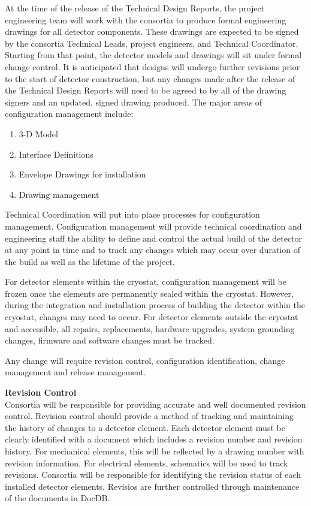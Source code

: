 At the time of the release of the Technical Design Reports, the
project engineering team will work with the consortia to produce
formal engineering drawings for all detector components.  These
drawings are expected to be signed by the consortia Technical Leads,
project engineers, and Technical Coordinator.  Starting from that
point, the detector models and drawings will sit under formal change
control.  It is anticipated that designs will undergo further
revisions prior to the start of detector construction, but any changes
made after the release of the Technical Design Reports will need to be
agreed to by all of the drawing signers and an updated, signed drawing
produced. The major areas of configuration management include:
\begin{enumerate}
  \item 3-D Model
  \item Interface Definitions
  \item Envelope Drawings for installation
  \item Drawing management
\end{enumerate}

Technical Coordination will put into place processes for
configuration management.  Configuration management will provide
technical coordination and engineering staff the ability to define and
control the actual build of the detector at any point in time and to
track any changes which may occur over duration of the build as well
as the lifetime of the project.

For detector elements within the cryostat, configuration management
will be frozen once the elements are permanently sealed within the
cryostat.  However, during the integration and installation process of
building the detector within the cryostat, changes may need to occur.
For detector elements outside the cryostat and accessible, all
repairs, replacements, hardware upgrades, system grounding changes,
firmware and software changes must be tracked.

Any change will require revision control, configuration
identification, change management and release management.

{\bf Revision Control}\\ Consortia will be responsible for providing
accurate and well documented revision control.  Revision control
should provide a method of tracking and maintaining the history of
changes to a detector element.  Each detector element must be clearly
identified with a document which includes a revision number and
revision history.  For mechanical elements, this will be reflected by
a drawing number with revision information.  For electrical elements,
schematics will be used to track revisions.  Consortia will be
responsible for identifying the revision status of each installed
detector elements. Revisios are further controlled through maintenance
of the documents in DocDB.

